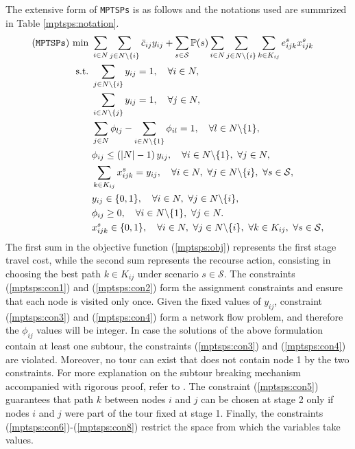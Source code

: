 The extensive form of \texttt{MPTSPs} is as follows and the notations used are summrized in Table \ref{mptsps:notation}.
\begin{subequations} \label{mptsps:formulation}
	\begin{align}
	(\texttt{MPTSPs})\ \textrm{min}\ &\sum_{i\in N}\sum_{j\in N\backslash\{i\}}\bar{c}_{ij}y_{ij}+\sum_{s\in \mathcal{S}}\PP(s)\sum_{i\in N}\sum_{j\in N\backslash\{i\}}\sum_{k\in K_{ij}}e_{ijk}^{s}x_{ijk}^{s} \label{mptsps:obj} \\ 
	\textrm{s.t.}\ &\sum_{j\in N\backslash\{i\}}y_{ij}=1,\quad\forall i\in N, \label{mptsps:con1} \\ 
	&\sum_{i\in N\backslash\{j\}}y_{ij}=1,\quad\forall j\in N,\label{mptsps:con2} \\ 
	&\sum_{j\in N}\phi_{lj}-\sum_{i\in N\backslash\{1\}}\phi_{il}=1,\quad\forall l\in N\backslash\{1\}, \label{mptsps:con3}  \\ 
	&\phi_{ij}\le \left(|N|-1\right)y_{ij},\quad\forall i\in N\backslash\{1\},\ \forall j\in N,  \label{mptsps:con4} \\ 
	&\sum_{k\in K_{ij}}x_{ijk}^{s}=y_{ij},\quad\forall i\in N,\ \forall j\in N\backslash\{i\},\ \forall s\in \mathcal{S}, \label{mptsps:con5} \\ 
	&y_{ij}\in \{0,1\},\quad \forall i\in N,\ \forall j\in N\backslash\{i\}, \label{mptsps:con6} \\ 
	&\phi_{ij} \ge 0, \quad \forall i\in N\backslash\{1\},\ \forall j\in N. \label{mptsps:con7} \\
	&x_{ijk}^{s}\in\{0,1\},\quad\forall i\in N,\ \forall j\in N\backslash\{i\},\ \forall k\in K_{ij},\ \forall s\in \mathcal{S}, \label{mptsps:con8} 
	\end{align}
\end{subequations}
The first sum in the objective function (\ref{mptsps:obj}) represents the first stage travel cost, while the second sum represents the recourse action, consisting in choosing the best path $k\in K_{ij}$ under scenario $s\in\mathcal{S}$. The constraints (\ref{mptsps:con1}) and (\ref{mptsps:con2}) form the assignment constraints and ensure that each node is visited only once. Given the fixed values of $y_{ij}$, constraint (\ref{mptsps:con3}) and (\ref{mptsps:con4}) form a network flow problem, and therefore the $\phi_{ij}$ values will be integer. In case the solutions of the above formulation contain at least one subtour, the constraints (\ref{mptsps:con3}) and (\ref{mptsps:con4}) are violated. Moreover, no tour can exist that does not contain node 1 by the two constraints. For more explanation on the subtour breaking mechanism accompanied with rigorous proof, refer to \cite{journal:GG1978}. The constraint (\ref{mptsps:con5}) guarantees that path $k$ between nodes $i$ and $j$ can be chosen at stage 2 only if nodes $i$ and $j$ were part of the tour fixed at stage 1. Finally, the constraints (\ref{mptsps:con6})-(\ref{mptsps:con8}) restrict the space from which the variables take values.

